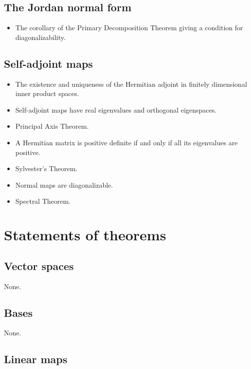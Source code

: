 \documentclass[12pt]{article}
\begin{document}
\begin{multicols}{2}
\subsection{The Jordan normal form}

\begin{itemize}
    \item The corollary of the Primary Decomposition Theorem giving
        a condition for diagonalizability.
\end{itemize}


\subsection{Self-adjoint maps}

\begin{itemize}
    \item The existence and uniqueness of the Hermitian adjoint in
        finitely dimensional inner product spaces.
    \item Self-adjoint maps have real eigenvalues and orthogonal
        eigenspaces.
    \item Principal Axis Theorem.
    \item A Hermitian matrix is positive definite if and only if
        all its eigenvalues are positive.
    \item Sylvester's Theorem.
    \item Normal maps are diagonalizable.
    \item Spectral Theorem.
\end{itemize}


\section{Statements of theorems}

\subsection{Vector spaces}

None.


\subsection{Bases}

None.


\subsection{Linear maps}


\end{multicols}
\end{document}
